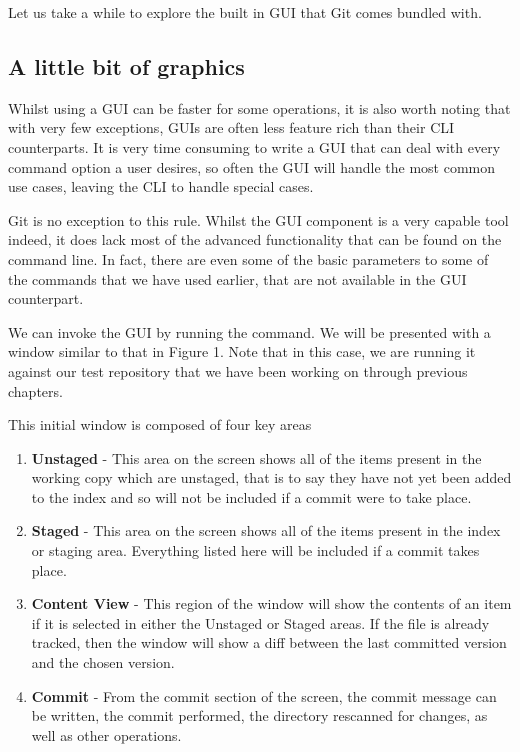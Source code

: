 Let us take a while to explore the built in GUI that Git comes bundled with.

\subsection{A little bit of graphics}
Whilst using a GUI can be faster for some operations, it is also worth noting that with very few exceptions, GUIs are often less feature rich than their CLI counterparts.
It is very time consuming to write a GUI that can deal with every command option a user desires, so often the GUI will handle the most common use cases, leaving the CLI to handle special cases.

Git is no exception to this rule.
Whilst the GUI component is a very capable tool indeed, it does lack most of the advanced functionality that can be found on the command line.
In fact, there are even some of the basic parameters to some of the commands that we have used earlier, that are not available in the GUI counterpart.

We can invoke the GUI by running the  command.
We will be presented with a window similar to that in Figure 1.
Note that in this case, we are running it against our test repository that we have been working on through previous chapters.


This initial window is composed of four key areas
\begin{enumerate}
\item \textbf{Unstaged} - This area on the screen shows all of the items present in the working copy which are unstaged, that is to say they have not yet been added to the index and so will not be included if a commit were to take place.
\item \textbf{Staged} - This area on the screen shows all of the items present in the index or staging area.
Everything listed here will be included if a commit takes place.
\item \textbf{Content View} - This region of the window will show the contents of an item if it is selected in either the Unstaged or Staged areas.
If the file is already tracked, then the window will show a diff between the last committed version and the chosen version.
\item \textbf{Commit} - From the commit section of the screen, the commit message can be written, the commit performed, the directory rescanned for changes, as well as other operations.
\end{enumerate}

